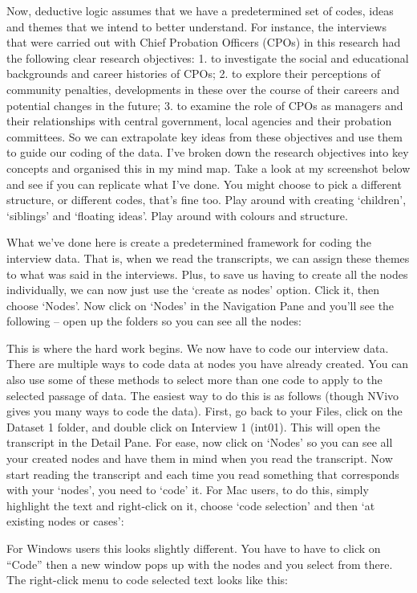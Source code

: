 \documentclass[
]{book}
\begin{document}
Now, deductive logic assumes that we have a predetermined set of codes, ideas and themes that we intend to better understand. For instance, the interviews that were carried out with Chief Probation Officers (CPOs) in this research had the following clear research objectives:
1. to investigate the social and educational backgrounds and career histories of CPOs;
2. to explore their perceptions of community penalties, developments in these over the course of their careers and potential changes in the future;
3. to examine the role of CPOs as managers and their relationships with central government, local agencies and their probation committees. So we can extrapolate key ideas from these objectives and use them to guide our coding of the data. I've broken down the research objectives into key concepts and organised this in my mind map. Take a look at my screenshot below and see if you can replicate what I've done. You might choose to pick a different structure, or different codes, that's fine too. Play around with creating `children', `siblings' and `floating ideas'. Play around with colours and structure.

What we've done here is create a predetermined framework for coding the interview data. That is, when we read the transcripts, we can assign these themes to what was said in the interviews. Plus, to save us having to create all the nodes individually, we can now just use the `create as nodes' option. Click it, then choose `Nodes'. Now click on `Nodes' in the Navigation Pane and you'll see the following -- open up the folders so you can see all the nodes:

This is where the hard work begins. We now have to code our interview data.
There are multiple ways to code data at nodes you have already created. You can also use some of these methods to select more than one code to apply to the selected passage of data.
The easiest way to do this is as follows (though NVivo gives you many ways to code the data). First, go back to your Files, click on the Dataset 1 folder, and double click on Interview 1 (int01). This will open the transcript in the Detail Pane. For ease, now click on `Nodes' so you can see all your created nodes and have them in mind when you read the transcript. Now start reading the transcript and each time you read something that corresponds with your `nodes', you need to `code' it.
For Mac users, to do this, simply highlight the text and right-click on it, choose `code selection' and then `at existing nodes or cases':

For Windows users this looks slightly different. You have to have to click on ``Code'' then a new window pops up with the nodes and you select from there. The right-click menu to code selected text looks like this:
\end{document}
